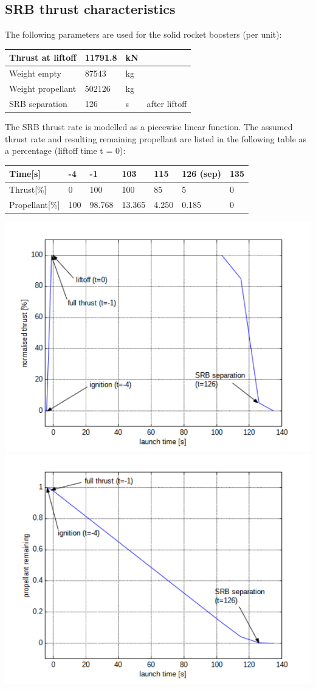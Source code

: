 \newpage
\subsection{SRB thrust characteristics}
The following parameters are used for the solid rocket boosters (per unit):

\begin{table}[H]
\centering
\begin{tabular}{|l|l|l|l|}
\hline
Thrust at liftoff & 11791.8 & kN & \\
\hline
Weight empty & 87543 & kg & \\
\hline
Weight propellant & 502126 & kg & \\
\hline
SRB separation & 126 & s & after liftoff\\
\hline
\end{tabular}
\end{table}

The SRB thrust rate is modelled as a piecewise linear function. The assumed thrust rate and resulting remaining propellant are listed in the following table as a percentage (liftoff time t = 0):

\begin{table}[H]
\centering
\begin{tabular}{|l|l|l|l|l|l|l|}
\hline
Time[s] 	 			& -4  & -1     & 103    & 115   & 126 (sep) & 135 \\
\hline
Thrust[\%] 			& 0   & 100    & 100    & 85    & 5         & 0   \\
\hline
Propellant[\%]  & 100 & 98.768 & 13.365 & 4.250 & 0.185     & 0   \\
\hline
\end{tabular}
\end{table}

\includegraphics[width=0.5\linewidth]{Images//Pic11.pdf}
\includegraphics[width=0.5\linewidth]{Images//Pic12.pdf}

